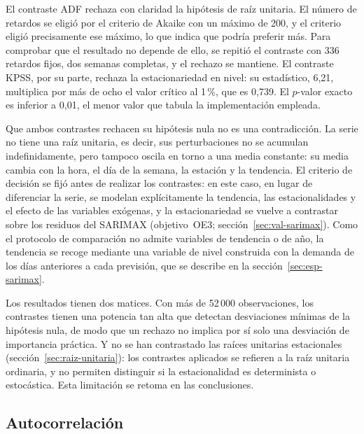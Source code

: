 El contraste ADF rechaza con claridad la hipótesis de raíz unitaria. El
número de retardos se eligió por el criterio de Akaike con un máximo de 200,
y el criterio eligió precisamente ese máximo, lo que indica que podría
preferir más. Para comprobar que el resultado no depende de ello, se repitió
el contraste con 336 retardos fijos, dos semanas completas, y el rechazo se
mantiene. El contraste KPSS, por su parte, rechaza la estacionariedad en
nivel: su estadístico, 6,21, multiplica por más de ocho el valor crítico al
1\,\%, que es 0,739. El $p$-valor exacto es inferior a 0,01, el menor valor
que tabula la implementación empleada.

Que ambos contrastes rechacen su hipótesis nula no es una contradicción. La
serie no tiene una raíz unitaria, es decir, sus perturbaciones no se
acumulan indefinidamente, pero tampoco oscila en torno a una media constante:
su media cambia con la hora, el día de la semana, la estación y la tendencia.
El criterio de decisión se fijó antes de realizar los contrastes: en este
caso, en lugar de diferenciar la serie, se modelan explícitamente la
tendencia, las estacionalidades y el efecto de las variables exógenas, y la
estacionariedad se vuelve a contrastar sobre los residuos del SARIMAX
(objetivo~OE3; sección~\ref{sec:val-sarimax}). Como el protocolo de
comparación no admite variables de tendencia o de año, la tendencia se recoge
mediante una variable de nivel construida con la demanda de los días
anteriores a cada previsión, que se describe en la
sección~\ref{sec:esp-sarimax}.

Los resultados tienen dos matices. Con más de 52\,000 observaciones, los
contrastes tienen una potencia tan alta que detectan desviaciones mínimas de
la hipótesis nula, de modo que un rechazo no implica por sí solo una
desviación de importancia práctica. Y no se han contrastado las raíces
unitarias estacionales (sección~\ref{sec:raiz-unitaria}): los contrastes
aplicados se refieren a la raíz unitaria ordinaria, y no permiten distinguir
si la estacionalidad es determinista o estocástica. Esta limitación se
retoma en las conclusiones.

\subsection{Autocorrelación}\label{sec:explo-acf}

